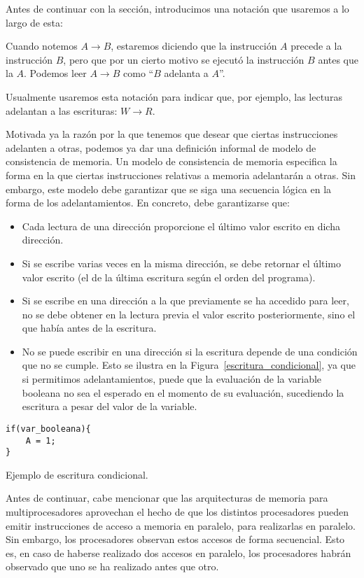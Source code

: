 Antes de continuar con la sección, introducimos una notación que usaremos a lo largo de esta:
\begin{notacion}
    Cuando notemos $A\rightarrow B$, estaremos diciendo que la instrucción $A$ precede a la instrucción $B$, pero que por un cierto motivo se ejecutó la instrucción $B$ antes que la $A$. Podemos leer $A\rightarrow B$ como ``$B$ adelanta a $A$''.

Usualmente usaremos esta notación para indicar que, por ejemplo, las lecturas adelantan a las escrituras: $W \rightarrow R$.
\end{notacion}
Motivada ya la razón por la que tenemos que desear que ciertas instrucciones adelanten a otras, podemos ya dar una definición informal de modelo de consistencia de memoria. Un modelo de consistencia de memoria especifica la forma en la que ciertas instrucciones relativas a memoria adelantarán a otras. Sin embargo, este modelo debe garantizar que se siga una secuencia lógica en la forma de los adelantamientos. En concreto, debe garantizarse que:
\begin{itemize}
    \item Cada lectura de una dirección proporcione el último valor escrito en dicha dirección.
    \item Si se escribe varias veces en la misma dirección, se debe retornar el último valor escrito (el de la última escritura según el orden del programa).
    \item Si se escribe en una dirección a la que previamente se ha accedido para leer, no se debe obtener en la lectura previa el valor escrito posteriormente, sino el que había antes de la escritura.
    \item No se puede escribir en una dirección si la escritura depende de una condición que no se cumple. Esto se ilustra en la Figura~\ref{escritura_condicional}, ya que si permitimos adelantamientos, puede que la evaluación de la variable booleana no sea el esperado en el momento de su evaluación, sucediendo la escritura a pesar del valor de la variable.
\end{itemize}

\begin{listing}[H]
\centering
\begin{verbatim}
if(var_booleana){
    A = 1;
}
\end{verbatim}
\caption{Ejemplo de escritura condicional.}
\label{escritura_condicional}
\end{listing}
Antes de continuar, cabe mencionar que las arquitecturas de memoria para multiprocesadores aprovechan el hecho de que los distintos procesadores pueden emitir instrucciones de acceso a memoria en paralelo, para realizarlas en paralelo. Sin embargo, los procesadores observan estos accesos de forma secuencial. Esto es, en caso de haberse realizado dos accesos en paralelo, los procesadores habrán observado que uno se ha realizado antes que otro.


